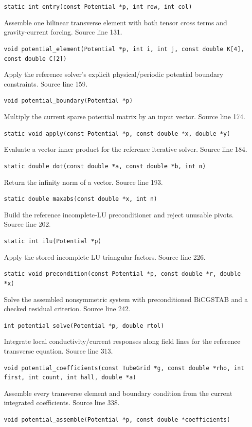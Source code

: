 \begin{description}[style=nextline,leftmargin=0pt,labelindent=0pt,labelwidth=0pt,labelsep=0pt]
{\small\nolinkurl{static int entry(const Potential *p, int row, int col)}}
\item[\texttt{potential\_element}] Assemble one bilinear transverse element with both tensor cross terms and gravity-current forcing. Source line 131.\par
{\small\nolinkurl{void potential_element(Potential *p, int i, int j, const double K[4], const double C[2])}}
\item[\texttt{potential\_boundary}] Apply the reference solver's explicit physical/periodic potential boundary constraints. Source line 159.\par
{\small\nolinkurl{void potential_boundary(Potential *p)}}
\item[\texttt{apply}] Multiply the current sparse potential matrix by an input vector. Source line 174.\par
{\small\nolinkurl{static void apply(const Potential *p, const double *x, double *y)}}
\item[\texttt{dot}] Evaluate a vector inner product for the reference iterative solver. Source line 184.\par
{\small\nolinkurl{static double dot(const double *a, const double *b, int n)}}
\item[\texttt{maxabs}] Return the infinity norm of a vector. Source line 193.\par
{\small\nolinkurl{static double maxabs(const double *x, int n)}}
\item[\texttt{ilu}] Build the reference incomplete-LU preconditioner and reject unusable pivots. Source line 202.\par
{\small\nolinkurl{static int ilu(Potential *p)}}
\item[\texttt{precondition}] Apply the stored incomplete-LU triangular factors. Source line 226.\par
{\small\nolinkurl{static void precondition(const Potential *p, const double *r, double *x)}}
\item[\texttt{potential\_solve}] Solve the assembled nonsymmetric system with preconditioned BiCGSTAB and a checked residual criterion. Source line 242.\par
{\small\nolinkurl{int potential_solve(Potential *p, double rtol)}}
\item[\texttt{potential\_coefficients}] Integrate local conductivity/current responses along field lines for the reference transverse equation. Source line 313.\par
{\small\nolinkurl{void potential_coefficients(const TubeGrid *g, const double *rho, int first, int count, int hall, double *a)}}
\item[\texttt{potential\_assemble}] Assemble every transverse element and boundary condition from the current integrated coefficients. Source line 338.\par
{\small\nolinkurl{void potential_assemble(Potential *p, const double *coefficients)}}
\end{description}
